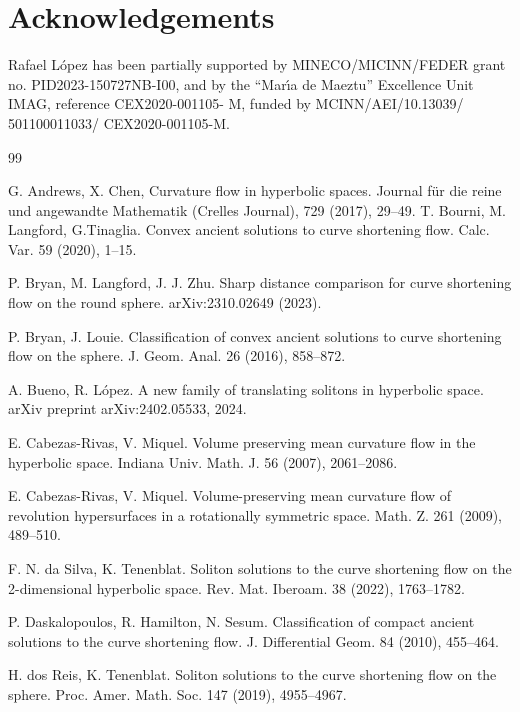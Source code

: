 \documentclass[12pt]{amsart}
\theoremstyle{plain}
\theoremstyle{definition}
\begin{document}
 


 \section*{Acknowledgements}
Rafael L\'opez has been partially supported by MINECO/MICINN/FEDER grant no. PID2023-150727NB-I00,  and by the ``Mar\'{\i}a de Maeztu'' Excellence Unit IMAG, reference CEX2020-001105- M, funded by MCINN/AEI/10.13039/ 501100011033/ CEX2020-001105-M.

\begin{thebibliography}{99}
%

 G. Andrews, X. Chen,  Curvature flow in hyperbolic spaces.  Journal f\"{u}r die reine und angewandte Mathematik (Crelles Journal),  729 (2017),   29--49.
 T.    Bourni, M. Langford,  G.Tinaglia. Convex ancient solutions to curve shortening flow. Calc. Var.  59 (2020), 1--15.

 P. Bryan, M. Langford, J. J. Zhu. Sharp distance comparison for curve shortening flow on the round sphere.   arXiv:2310.02649 (2023).


 P.  Bryan, J.  Louie. Classification of convex ancient solutions to curve shortening flow on the sphere.  J.   Geom. Anal.   26 (2016), 858--872.

 A. Bueno, R. L\'opez. A new family of translating solitons in hyperbolic space. arXiv preprint arXiv:2402.05533, 2024.

 E. Cabezas-Rivas, V. Miquel. Volume preserving mean curvature flow in the hyperbolic space. Indiana Univ. Math. J. 56 (2007), 2061--2086.

 E. Cabezas-Rivas, V. Miquel. Volume-preserving mean curvature flow of revolution hypersurfaces in a rotationally symmetric space. Math. Z. 261 (2009), 489--510.

 F. N.  da Silva, K.  Tenenblat. Soliton solutions to the curve shortening flow on the 2-dimensional hyperbolic space. Rev. Mat. Iberoam. 38 (2022), 1763--1782.

 P. Daskalopoulos, R. Hamilton, N. Sesum. Classification of compact ancient solutions to the curve shortening flow. J.  Differential Geom. 84 (2010), 455--464.

 H. dos Reis, K. Tenenblat. Soliton solutions to the curve shortening flow on the sphere. Proc. Amer. Math. Soc.  147 (2019), 4955--4967.


\end{thebibliography}
\end{document}

